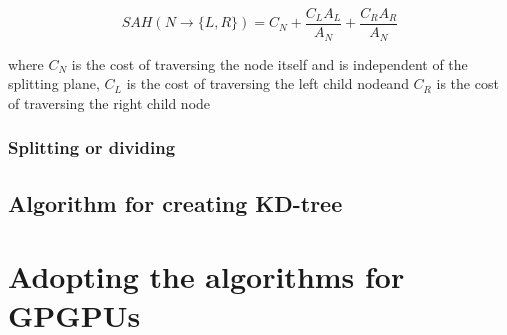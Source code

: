 \begin{displaymath}
  SAH(N \rightarrow \{L, R\}) = C_N + \frac{C_L A_L}{A_N} +
  \frac{C_R A_R}{A_N}
\end{displaymath}

where $C_N$ is the cost of traversing the node itself and is
independent of the splitting plane, $C_L$ is the cost of traversing
the left child nodeand $C_R$ is the cost of traversing the right child
node



\subsubsection{Splitting or dividing}









\subsection{Algorithm for creating KD-tree}




\section{Adopting the algorithms for GPGPUs}


